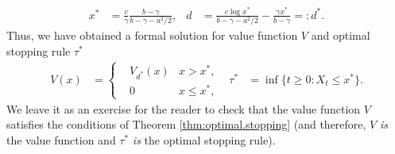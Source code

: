 \documentclass[12pt]{book}
\numberwithin{equation}{chapter}
\theoremstyle{plain}
\numberwithin{theorem}{section}
\theoremstyle{definition}
\numberwithin{exercise}{chapter}
\newcommand{\<}{\langle}
\renewcommand{\>}{\rangle}
\renewcommand{\(}{\left(}
\renewcommand{\)}{\right)}
\renewcommand{\[}{\left[}
\renewcommand{\]}{\right]}
\newcommand\gam{\gamma}
\begin{document}
\begin{align}
x^*
	&= \frac{c}{\gam} \frac{b-\gam}{b-\gam-a^2/2}, &
d
	&=	\frac{c \log x^* }{b - \gam - a^2/2} - \frac{ \gam x^*}{b -\gam} =: d^*.
\end{align}
Thus, we have obtained a formal solution for value function $V$ and optimal stopping rule $\tau^*$
\begin{align}
V(x)
	&=	\left\{ \begin{aligned}	
			&V_{d^*}(x) &x > x^* , \\
			&0			&x \leq x^* ,
			\end{aligned} \right. &
\tau^*
	&=	\inf\{ t \geq 0 : X_t \leq x^* \} .
\end{align}
We leave it as an exercise for the reader to check that the value function $V$ satisfies the conditions of Theorem \ref{thm:optimal.stopping} (and therefore, $V$ \emph{is} the value function and $\tau^*$ \emph{is} the optimal stopping rule).
\end{document}
